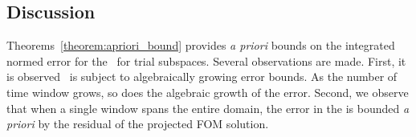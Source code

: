 \begin{comment}
Thus we have,
$$ \intSlabArg{n} \norm{ \stateROMSolArgt{n}{t} - \stateROMStarSolArgt{n}{t}} = \DeltaSlabArg{n} \errorArgt{n}{\timeStartArg{n}}.$$
Inserting the above into~\eqref{eq:boundtmp},
\begin{equation*}
\intSlabArg{n} \norm{\errorArgt{n}{t}} dt \le \DeltaSlabArg{n} \norm{\errorArgt{n}{\timeStartArg{n}}  }   + \lipshitzi \intSlabArg{n} \norm{ \resid(\stateFOMProjSolArgt{n}{t}) } dt.
\end{equation*}
\end{proof}
\end{comment}
\subsection{Discussion} 
Theorems~\ref{theorem:apriori_bound} provides \textit{a priori} bounds on the integrated normed error for the \methodAcronymROM\ for \spatialAcronym trial subspaces. Several 
observations are made. First, it is observed \methodAcronym\ is subject to algebraically growing error bounds. As the number of 
time window grows, so does the algebraic growth of the error. Second, we observe that when a single window spans the entire domain, the error in the \methodAcronymROM is bounded \textit{a priori} by the residual of the projected FOM solution. 
%

